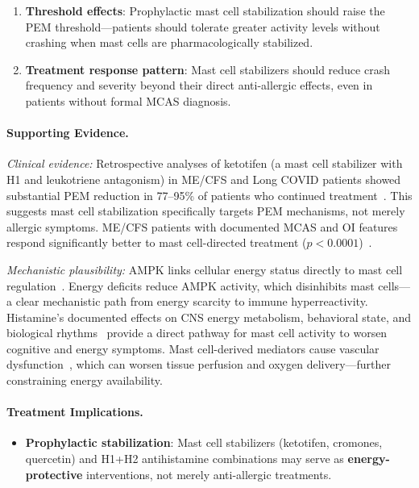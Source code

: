 \begin{speculation}
\begin{enumerate}
    \item \textbf{Threshold effects}: Prophylactic mast cell stabilization should raise the PEM threshold---patients should tolerate greater activity levels without crashing when mast cells are pharmacologically stabilized.

    \item \textbf{Treatment response pattern}: Mast cell stabilizers should reduce crash frequency and severity beyond their direct anti-allergic effects, even in patients without formal MCAS diagnosis.
\end{enumerate}

\paragraph{Supporting Evidence.}

\textit{Clinical evidence:} Retrospective analyses of ketotifen (a mast cell stabilizer with H1 and leukotriene antagonism) in ME/CFS and Long COVID patients showed substantial PEM reduction in 77--95\% of patients who continued treatment~\cite{Weinstock2024Ketotifen}. This suggests mast cell stabilization specifically targets PEM mechanisms, not merely allergic symptoms. ME/CFS patients with documented MCAS and OI features respond significantly better to mast cell-directed treatment ($p<0.0001$)~\cite{Wirth2023,Frioni2025MCAS}.

\textit{Mechanistic plausibility:} AMPK links cellular energy status directly to mast cell regulation~\cite{Theoharides2021Cells}. Energy deficits reduce AMPK activity, which disinhibits mast cells---a clear mechanistic path from energy scarcity to immune hyperreactivity. Histamine's documented effects on CNS energy metabolism, behavioral state, and biological rhythms~\cite{Zhang2024MastBrain} provide a direct pathway for mast cell activity to worsen cognitive and energy symptoms. Mast cell-derived mediators cause vascular dysfunction~\cite{Wirth2023}, which can worsen tissue perfusion and oxygen delivery---further constraining energy availability.

\paragraph{Treatment Implications.}

\begin{itemize}
    \item \textbf{Prophylactic stabilization}: Mast cell stabilizers (ketotifen, cromones, quercetin) and H1+H2 antihistamine combinations may serve as \textbf{energy-protective} interventions, not merely anti-allergic treatments.


\end{itemize}
\end{speculation}
